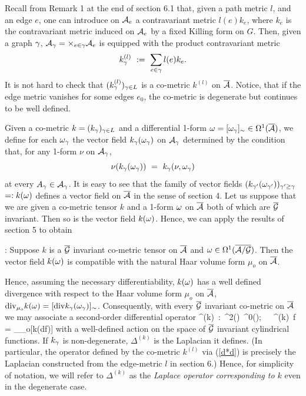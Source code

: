\bigskip
{} Recall from Remark 1 at the end of section 
6.1 that, given a path metric $l$, and an edge $e$, one can introduce
on ${\cal A}_e$ a contravariant metric $l(e)k_e$, where $k_e$ is the
contravariant metric induced on ${\cal A}_e$ by a fixed Killing form on $G$.
Then, given a graph $\gamma$, ${\cal A}_\gamma=\times_{e\in\gamma}{\cal A}_e$ is equipped with
the product contravariant metric
%
 $$k^{(l)}_\gamma\ :=\ \sum_{e\in\gamma} l(e)k_e.$$ 
%
It is not hard to check that $(k^{(l)}_\gamma)_{\gamma\in L}$ is a co-metric
$k^{(l)}$ on ${\overline {{\cal A}}}$. Notice, that if the edge metric vanishes for some
edges $e_0$, the co-metric is degenerate but continues to be well
defined.
\bigskip     

Given a co-metric $k=(k_\gamma)_{\gamma\in L}$ and a differential 1-form $\omega =
[\omega_\gamma]_\sim \in \Omega^1({\overline {{\cal A}}})$, we define for each $\omega_\gamma$ the vector
field $k_\gamma(\omega_\gamma)$ on ${\cal A}_\gamma$ determined by the condition that, for
any 1-form $\nu$ on ${\cal A}_\gamma$,
%
$$
\nu(k_\gamma(\omega_\gamma))\ =\ k_\gamma(\nu, \omega_\gamma)
$$ 
%
at every $A_\gamma\in{\cal A}_\gamma$. It is easy to see that the family of vector
fields $(k_{\gamma'}(\omega_{\gamma'}))_{\gamma'\ge \gamma}$ $=: k(\omega)$ defines a vector
field on ${\overline {{\cal A}}}$ in the sense of section 4.  Let us suppose that we are
given a co-metric tensor $k$ and a 1-form $\omega$ on $\overline{{\cal A}}$ both of which
are ${\overline {{\cal G}}}$ invariant. Then so is the vector field $k(\omega)$.  Hence, we
can apply the results of section 5 to obtain

\begin{proposition}{\rm :} \label{d*} Suppose  $k$ is a ${\overline {{\cal G}}}$ 
invariant co-metric tensor on ${\overline {{\cal A}}}$ and $\omega\in\Omega^1(\overline{{\cal A}/{\cal G}})$. Then
the vector field $k(\omega)$ is compatible with the natural Haar volume
form $\mu_o$ on $\overline{{\cal A}}$.
\end{proposition}
 
Hence, assuming the necessary differentiability, $k(\omega)$ has a well
defined divergence with respect to the Haar volume form $\mu_o$ on
$\overline{{\cal A}}$, ${\rm div}_{\mu_o} k(\omega) = [{\rm div} k_\gamma(\omega_\gamma)]_\sim$.  Consequently,
with every ${\overline {{\cal G}}}$ invariant co-metric on ${\overline {{\cal A}}}$ we may associate a
second-order differential operator
\be \label{d*d}
\Delta^{(k)}\ :\ \Cyl^2(\agb)\ \mapsto \Cyl^0(\agb);\ \ \ 
\Delta^{(k)}\ f = \div_{\mu_o}[k(df)]
\ee
with a well-defined action on the space of ${\overline {{\cal G}}}$ invariant cylindrical
functions. If $k_\gamma$ is non-degenerate, $\Delta^{(k)}$ is the
Laplacian it defines. (In particular, the operator defined by the
co-metric $k^{(l)}$ via (\ref{d*d}) is precisely the Laplacian
constructed from the edge-metric $l$ in section 6.)  Hence, for
simplicity of notation, we will refer to $\Delta^{(k)}$ as the {\it
Laplace operator corresponding to $k$} even in the degenerate case.

